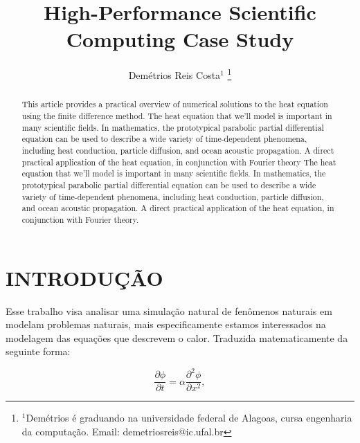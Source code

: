 \documentclass[letterpaper, 10 pt, conference]{ieeeconf}
\title{\LARGE \bf
High-Performance Scientific Computing Case Study
}
\author{Demétrios Reis Costa$^{1}$%
\thanks{$^{1}$Demétrios é graduando na universidade federal de Alagoas, cursa engenharia da computação.
Email: demetriosreis@ic.ufal.br}%
}
\begin{document}
\maketitle
\thispagestyle{empty}
\pagestyle{empty}


\begin{abstract}

This article provides a practical overview of numerical solutions to the heat equation using the finite difference method. The heat equation that we’ll model is important in many scientific fields. In mathematics, the prototypical parabolic partial differential equation can be used to describe a wide variety of time-dependent phenomena, including heat conduction, particle diffusion, and ocean acoustic propagation. A direct practical application of the heat equation, in conjunction with Fourier theory The heat equation that we’ll model is important in many scientific fields. In mathematics, the prototypical parabolic partial differential equation can be used to describe a wide variety of time-dependent phenomena, including heat conduction, particle diffusion, and ocean acoustic propagation. A direct practical application of the heat equation, in conjunction with Fourier theory.

\end{abstract}

\section{INTRODUÇÃO}

Esse trabalho visa analisar uma simulação natural de fenômenos naturais em modelam problemas naturais, mais especificamente
estamos interessados na modelagem das equações que descrevem o calor. Traduzida matematicamente da seguinte forma:

\begin{equation*} \frac{\partial\phi}{\partial t}=\alpha\frac{\partial^{2}\phi}{\partial x^{2}},\tag{1} \end{equation*}
\end{document}
